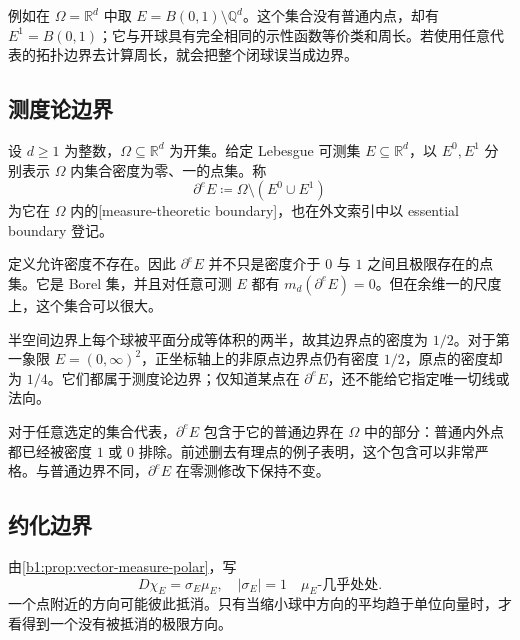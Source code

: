 \ProseParagraphBreak

例如在 \(\Omega=\mathbb R^d\) 中取 \(E=B(0,1)\setminus\mathbb Q^d\)。这个集合没有普通内点，却有 \(E^1=B(0,1)\)；它与开球具有完全相同的示性函数等价类和周长。若使用任意代表的拓扑边界去计算周长，就会把整个闭球误当成边界。

\subsection{测度论边界}
\label{b1:subsec:270403}

\begin{definition}\label{b1:def:measure-theoretic-boundary}
设 \(d\ge1\) 为整数，\(\Omega\subseteq\mathbb R^d\) 为开集。给定 Lebesgue 可测集 \(E\subseteq\mathbb R^d\)，以 \(E^0,E^1\) 分别表示 \(\Omega\) 内集合密度为零、一的点集。称
\[
 \partial^eE\coloneqq\Omega\setminus(E^0\cup E^1)
\]
为它在 \(\Omega\) 内的[measure-theoretic boundary]，也在外文索引中以 essential boundary 登记。
\end{definition}

定义允许密度不存在。因此 \(\partial^eE\) 并不只是密度介于 \(0\) 与 \(1\) 之间且极限存在的点集。它是 Borel 集，并且对任意可测 \(E\) 都有 \(m_d(\partial^eE)=0\)。但在余维一的尺度上，这个集合可以很大。

\ProseParagraphBreak

半空间边界上每个球被平面分成等体积的两半，故其边界点的密度为 \(1/2\)。对于第一象限 \(E=(0,\infty)^2\)，正坐标轴上的非原点边界点仍有密度 \(1/2\)，原点的密度却为 \(1/4\)。它们都属于测度论边界；仅知道某点在 \(\partial^eE\)，还不能给它指定唯一切线或法向。

\ProseParagraphBreak

对于任意选定的集合代表，\(\partial^eE\) 包含于它的普通边界在 \(\Omega\) 中的部分：普通内外点都已经被密度 \(1\) 或 \(0\) 排除。前述删去有理点的例子表明，这个包含可以非常严格。与普通边界不同，\(\partial^eE\) 在零测修改下保持不变。

\subsection{约化边界}
\label{b1:subsec:270404}

由\cref{b1:prop:vector-measure-polar}，写
\[
 D\chi_E=\sigma_E\mu_E,\quad |\sigma_E|=1
 \quad\mu_E\text{-几乎处处}.
\]
一个点附近的方向可能彼此抵消。只有当缩小球中方向的平均趋于单位向量时，才看得到一个没有被抵消的极限方向。

